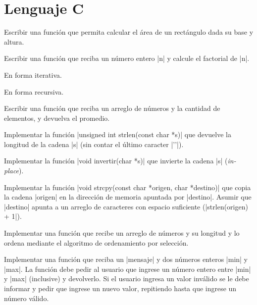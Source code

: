 \chapter{Lenguaje C}

\begin{ejercicio}
Escribir una función que permita calcular el área de un rectángulo dada
su base y altura.
\end{ejercicio}

\begin{ejercicio}
Escribir una función que reciba un número entero |n| y calcule el factorial de
|n|.
\begin{partes}
    \item En forma iterativa.
    \item En forma recursiva.
\end{partes}
\end{ejercicio}

\begin{ejercicio}
Escribir una función que reciba un arreglo de números y la cantidad de
elementos, y devuelva el promedio.
\end{ejercicio}

\begin{ejercicio}
Implementar la función |unsigned int strlen(const char *s)| que devuelve la
longitud de la cadena |s| (sin contar el último caracter |'\0'|).
\end{ejercicio}

\begin{ejercicio}
Implementar la función |void invertir(char *s)| que invierte la cadena
|s| ({\it in-place}).
\end{ejercicio}

\begin{ejercicio}
Implementar la función |void strcpy(const char *origen, char *destino)| que
copia la cadena |origen| en la dirección de memoria apuntada por |destino|.
Asumir que |destino| apunta a un arreglo de caracteres con espacio suficiente
(|strlen(origen) + 1|).
\end{ejercicio}

\begin{ejercicio}
Implementar una función que recibe un arreglo de números y su longitud y
lo ordena mediante el algoritmo de ordenamiento por selección.
\end{ejercicio}

\begin{ejercicio}
Implementar una función que reciba un |mensaje| y dos números enteros |min| y
|max|. La función debe pedir al usuario que ingrese un número entero entre
|min| y |max| (inclusive) y devolverlo. Si el usuario ingresa un valor
inválido se le debe informar y pedir que ingrese un nuevo valor, repitiendo
hasta que ingrese un número válido.
\end{ejercicio}


